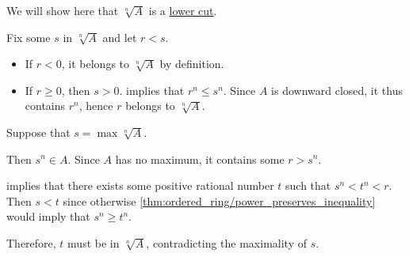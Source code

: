 \begin{defproof}
  We will show here that \( \sqrt[n]{ A } \) is a \hyperref[def:lower_cut]{lower cut}.

   Fix some \( s \) in \( \sqrt[n]{ A } \) and let \( r < s \).

  \begin{itemize}
    \item If \( r < 0 \), it belongs to \( \sqrt[n]{ A } \) by definition.

    \item If \( r \geq 0 \), then \( s > 0 \).  implies that \( r^n \leq s^n \). Since \( A \) is downward closed, it thus contains \( r^n \), hence \( r \) belongs to \( \sqrt[n]{ A } \).
  \end{itemize}

   Suppose that \( s = \max \sqrt[n]{ A } \).

  Then \( s^n \in A \). Since \( A \) has no maximum, it contains some \( r > s^n \).

   implies that there exists some positive rational number \( t \) such that \( s^n < t^n < r \). Then \( s < t \) since otherwise \cref{thm:ordered_ring/power_preserves_inequality} would imply that \( s^n \geq t^n \).

  Therefore, \( t \) must be in \( \sqrt[n]{ A } \), contradicting the maximality of \( s \).
\end{defproof}

